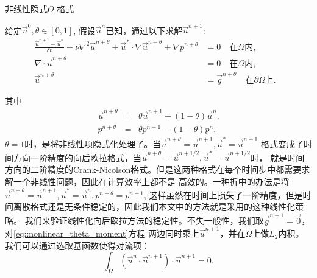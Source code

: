         \begin{algorithm}
            \caption{非线性隐式$\Theta$ 格式}
            \begin{algorithmic}[1]
                给定$\vec{u}^0, \theta \in [0, 1]$, 假设$\vec{u}^n$已知，通过以下求解$\vec{u}^{n + 1}$:
                \begin{eqnarray}
                    \frac{\vec{u}^{n + 1} - \vec{u}^n}{\delta t} - \nu \nabla^2\vec{u}^{n + \theta} + \vec{u}^* \cdot \nabla\vec{u}^{n + \theta}
                    + \nabla p^{n + \theta} & = 0\quad \mbox {在} \Omega \mbox{内},&
                    \label{alg::nonlinear_Theta_moment}    \\
                    \nabla \cdot \vec{u}^{n + \theta} & = 0 \quad \mbox{在} \Omega \mbox{内},&
                    \label{eq::nonlinear_theta_mass} \\
                    \vec{u}^{n + \theta} & = \vec{g}^{n + \theta} \quad \mbox{在} \partial \Omega \mbox{上}.&
               \end{eqnarray}
            \end{algorithmic}
            \label{alg::nonlinear_Theta}
         \end{algorithm}
         其中
         \begin{eqnarray}
            \vec{u}^{n + \theta} & = & \theta\vec{u}^{n + 1} + (1 - \theta)\vec{u}^n. \\
            p^{n + \theta} & = & \theta p^{n + 1} - (1 - \theta)p^n.
         \end{eqnarray}
         $\theta = 1$时，是将非线性项隐式化处理了。当$\vec{u}^{n + \theta} = \vec{u}^{n + 1}, \vec{u}^* = \vec{u}^{n + 1}$
         格式变成了时间方向一阶精度的向后欧拉格式，当$\vec{u}^{n + \theta} = \vec{u}^{n + 1/2}, \vec{u}^* = \vec{u}^{n + 1/2}$时，
         就是时间方向的二阶精度的Crank-Nicolson格式。但是这两种格式在每个时间步中都需要求解一个非线性问题，因此在计算效率上都不是
         高效的。一种折中的办法是将$\vec{u}^{n + \theta} = \vec{u}^{n + 1}, \vec{u}^* = \vec{u}^{n},p^{n + \theta} = p^{n + 1}$,
         这样虽然在时间上损失了一阶精度，但是时间离散格式还是无条件稳定的，因此我们本文中的方法就是采用的这种线性化策略。
         我们来验证线性化向后欧拉方法的稳定性。不失一般性，我们取$\vec{g}^{n + 1} = \vec{0}$，对\eqref{eq::nonlinear_theta_moment}方程
         两边同时乘上$\vec{u}^{n + 1}$，并在$\Omega$上做$L_2$内积。我们可以通过选取基函数使得对流项：
         \begin{equation}
            \int_{\Omega}(\vec{u}^n \cdot \vec{u}^{n + 1}) \cdot \vec{u}^{n + 1} = 0.
         \end{equation}
